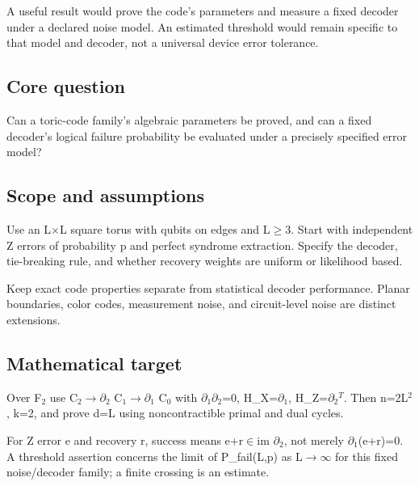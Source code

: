 \documentclass[
  11pt,
]{article}
\begin{document}
A useful result would prove the code's parameters and measure a fixed
decoder under a declared noise model. An estimated threshold would
remain specific to that model and decoder, not a universal device error
tolerance.

\subsection{Core question}

Can a toric-code family's algebraic parameters be proved, and can a
fixed decoder's logical failure probability be evaluated under a
precisely specified error model?

\subsection{Scope and assumptions}

Use an L\ensuremath{\times}L square torus with qubits on edges and
L\ensuremath{\ge}3. Start with independent Z errors of probability p and
perfect syndrome extraction. Specify the decoder, tie-breaking rule, and
whether recovery weights are uniform or likelihood based.

Keep exact code properties separate from statistical decoder
performance. Planar boundaries, color codes, measurement noise, and
circuit-level noise are distinct extensions.

\subsection{Mathematical target}

Over F\ensuremath{{}_{2}} use
C\ensuremath{{}_{2}}\ensuremath{\to}\ensuremath{\partial}\ensuremath{{}_{2}}
C\ensuremath{{}_{1}}\ensuremath{\to}\ensuremath{\partial}\ensuremath{{}_{1}}
C\ensuremath{{}_{0}} with
\ensuremath{\partial}\ensuremath{{}_{1}}\ensuremath{\partial}\ensuremath{{}_{2}}=0,
H\_X=\ensuremath{\partial}\ensuremath{{}_{1}},
H\_Z=\ensuremath{\partial}\ensuremath{{}_{2}}\ensuremath{{}^{T}}. Then
n=2L\ensuremath{{}^{2}}, k=2, and prove d=L using noncontractible primal
and dual cycles.

For Z error e and recovery r, success means e+r\ensuremath{\in}im
\ensuremath{\partial}\ensuremath{{}_{2}}, not merely
\ensuremath{\partial}\ensuremath{{}_{1}}(e+r)=0. A threshold assertion
concerns the limit of P\_fail(L,p) as
L\ensuremath{\to}\ensuremath{\infty} for this fixed noise/decoder
family; a finite crossing is an estimate.
\end{document}
